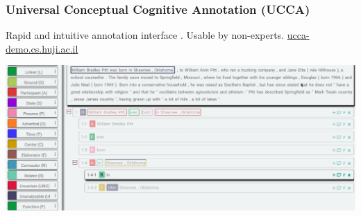 \documentclass[t,xcolor={svgnames}]{beamer}
\begin{document}
\begin{frame}
\frametitle{Universal Conceptual Cognitive Annotation (UCCA)}
Rapid and intuitive annotation interface \cite{abend2017uccaapp}.
Usable by non-experts.
\hfill\url{ucca-demo.cs.huji.ac.il}

\vfill
\begin{adjustbox}{center}
  \includegraphics[width=\pagewidth,height=\textheight,keepaspectratio]{uccaapp.png}
\end{adjustbox}

\end{frame}
\end{document}
